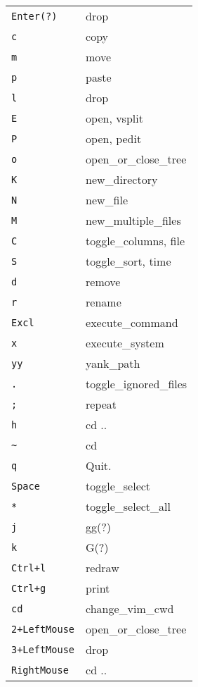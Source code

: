 \begin{multicols}{3}
\section{}
\begin{tabular}{@{}ll@{}}
    \verb!Enter(?)! & drop \\
	\verb!c! & copy \\
	\verb!m! & move \\
	\verb!p! & paste \\
	\verb!l! & drop \\
	\verb!E! & open, vsplit \\
	\verb!P! & open, pedit \\
	\verb!o! & open\_or\_close\_tree \\
	\verb!K! & new\_directory \\
	\verb!N! & new\_file \\
	\verb!M! & new\_multiple\_files \\
    \verb!C! & toggle\_columns, file \\
    \verb!S! & toggle\_sort, time \\
	\verb!d! & remove \\
	\verb!r! & rename \\
    \verb!Excl! &  execute\_command \\
	\verb!x! & execute\_system \\
	\verb!yy! & yank\_path \\
	\verb!.! & toggle\_ignored\_files \\
	\verb!;! & repeat \\
	\verb!h! & cd .. \\
	\verb!~! & cd \\
	\verb!q! & Quit. \\
	\verb!Space! & toggle\_select \\
	\verb!*! & toggle\_select\_all \\
    \verb!j! & gg(?) \\
    \verb!k! & G(?) \\
	\verb!Ctrl+l! & redraw \\
	\verb!Ctrl+g! & print \\
	\verb!cd! & change\_vim\_cwd \\
	\verb!2+LeftMouse! & open\_or\_close\_tree \\
	\verb!3+LeftMouse! & drop \\
	\verb!RightMouse! & cd .. \\
\end{tabular}


\end{multicols}
